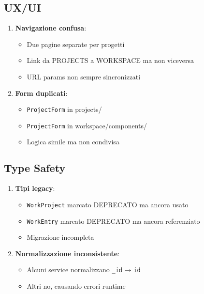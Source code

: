 \documentclass[11pt,a4paper]{article}
\begin{document}
\subsection{UX/UI}

\begin{enumerate}
    \item \textbf{Navigazione confusa}:
    \begin{itemize}
        \item Due pagine separate per progetti
        \item Link da PROJECTS a WORKSPACE ma non viceversa
        \item URL params non sempre sincronizzati
    \end{itemize}
    
    \item \textbf{Form duplicati}:
    \begin{itemize}
        \item \texttt{ProjectForm} in projects/
        \item \texttt{ProjectForm} in workspace/components/
        \item Logica simile ma non condivisa
    \end{itemize}
\end{enumerate}

\subsection{Type Safety}

\begin{enumerate}
    \item \textbf{Tipi legacy}:
    \begin{itemize}
        \item \texttt{WorkProject} marcato DEPRECATO ma ancora usato
        \item \texttt{WorkEntry} marcato DEPRECATO ma ancora referenziato
        \item Migrazione incompleta
    \end{itemize}
    
    \item \textbf{Normalizzazione inconsistente}:
    \begin{itemize}
        \item Alcuni service normalizzano \texttt{\_id} → \texttt{id}
        \item Altri no, causando errori runtime
    \end{itemize}
\end{enumerate}
\end{document}
